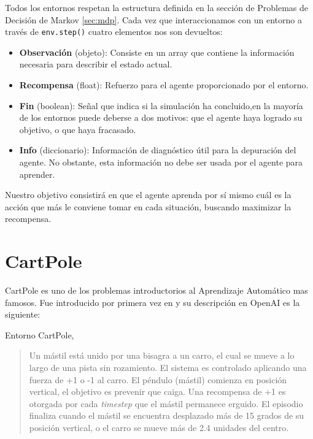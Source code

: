 Todos los entornos respetan la estructura definida en la sección de Problemas de Decisión de Markov \ref{sec:mdp}. Cada vez que interaccionamos con un entorno a través de \texttt{env.step()} cuatro elementos nos son devueltos:
\begin{itemize}
    \item \textbf{Observación} (objeto): Consiste en un array que contiene la información necesaria para describir el estado actual.
    \item \textbf{Recompensa} (float): Refuerzo para el agente proporcionado por el entorno.
    \item \textbf{Fin} (boolean): Señal que indica si la simulación ha concluido,en la mayoría de los entornos puede deberse a dos motivos: que el agente haya logrado su objetivo, o que haya fracasado.
    \item \textbf{Info} (diccionario): Información de diagnóstico útil para la depuración del agente. No obstante, esta información no debe ser usada por el agente para aprender.
\end{itemize}

Nuestro objetivo consistirá en que el agente aprenda por sí mismo cuál es la acción que más le conviene tomar en cada situación, buscando maximizar la recompensa.

\section{CartPole}
\label{cartpole-sec}
CartPole es uno de los problemas introductorios al Aprendizaje Automático mas famosos. Fue introducido por primera vez en \citet{BartoSA83} y su descripción en OpenAI es la siguiente:

%
       {Entorno CartPole, \citet{BartoSA83}}

\begin{quote}
    Un mástil está unido por una bisagra a un carro, el cual se mueve a lo largo de una pista sin rozamiento. El sistema es controlado aplicando una fuerza de +1 o -1 al carro. El péndulo (mástil) comienza en posición vertical, el objetivo es prevenir que caiga. Una recompensa de +1 es otorgada por cada \textit{timestep} que el mástil permanece erguido. El episodio finaliza cuando el mástil se encuentra desplazado más de 15 grados de su posición vertical, o el carro se mueve más de 2.4 unidades del centro.
\end{quote}

